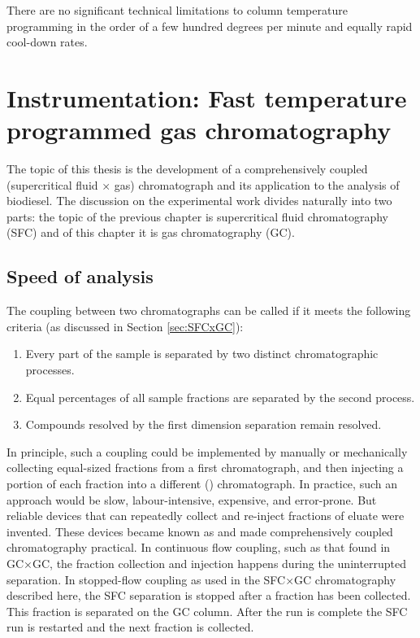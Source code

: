 
\begin{savequote}[\quotewidth] There are no significant technical limitations to column
temperature programming in the order of a few hundred degrees per minute and
equally rapid cool-down rates.
\end{savequote}

\chapter[Instrumentation: Fast GC]{Instrumentation: Fast temperature programmed gas chromatography} %

\label{Chapter5} %

The topic of this thesis is the development of a comprehensively coupled
(supercritical fluid × gas) chromatograph and its application to the analysis of
biodiesel. The discussion on the experimental work divides naturally into two
parts: the topic of the previous chapter is supercritical fluid chromatography
(SFC) and of this chapter it is gas chromatography (GC).

\section{Speed of analysis}

The coupling between two chromatographs can be called  if
it meets the following criteria (as discussed in Section \ref{sec:SFCxGC}):
\begin{enumerate}
  \item Every part of the sample is separated by two distinct chromatographic processes.
  \item Equal percentages of all sample fractions are separated by the second process.	 
  \item Compounds resolved by the first dimension separation remain resolved.  
\end{enumerate} 

In principle, such a coupling could be implemented by manually or mechanically
collecting equal-sized fractions from a first \oneD chromatograph, and then
injecting a portion of each fraction into a different (\twoD) chromatograph. In
practice, such an approach would be slow, labour-intensive, expensive, and
error-prone. But reliable devices that can repeatedly collect and re-inject
fractions of eluate were invented. These devices became known as
 and made comprehensively coupled chromatography practical.
In continuous flow coupling, such as that found in GC×GC, the fraction
collection and \twoD injection happens during the uninterrupted \oneD
separation. In stopped-flow coupling as used in the SFC×GC chromatography
described here, the \oneD SFC separation is stopped after a fraction has been
collected. This fraction is separated on the \twoD GC column. After the \twoD
run is complete the SFC run is restarted and the next fraction is collected.

